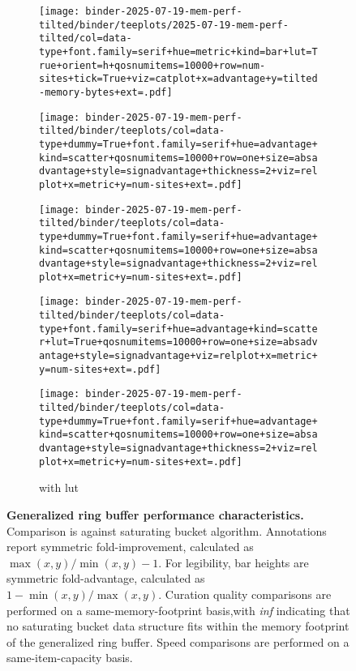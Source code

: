 \begin{figure*}
\begin{subfigure}{\textwidth}
\texttt{[image: binder-2025-07-19-mem-perf-tilted/binder/teeplots/2025-07-19-mem-perf-tilted/col=data-type+font.family=serif+hue=metric+kind=bar+lut=True+orient=h+qosnumitems=10000+row=num-sites+tick=True+viz=catplot+x=advantage+y=tilted-memory-bytes+ext=.pdf]}

\vspace{-1ex}

\texttt{[image: binder-2025-07-19-mem-perf-tilted/binder/teeplots/col=data-type+dummy=True+font.family=serif+hue=advantage+kind=scatter+qosnumitems=10000+row=one+size=absadvantage+style=signadvantage+thickness=2+viz=relplot+x=metric+y=num-sites+ext=.pdf]}

\vspace{-3ex}

\texttt{[image: binder-2025-07-19-mem-perf-tilted/binder/teeplots/col=data-type+dummy=True+font.family=serif+hue=advantage+kind=scatter+qosnumitems=10000+row=one+size=absadvantage+style=signadvantage+thickness=2+viz=relplot+x=metric+y=num-sites+ext=.pdf]}

\vspace{-1.2ex}

\texttt{[image: binder-2025-07-19-mem-perf-tilted/binder/teeplots/col=data-type+font.family=serif+hue=advantage+kind=scatter+lut=True+qosnumitems=10000+row=one+size=absadvantage+style=signadvantage+viz=relplot+x=metric+y=num-sites+ext=.pdf]}

\vspace{-2.8ex}

\texttt{[image: binder-2025-07-19-mem-perf-tilted/binder/teeplots/col=data-type+dummy=True+font.family=serif+hue=advantage+kind=scatter+qosnumitems=10000+row=one+size=absadvantage+style=signadvantage+thickness=2+viz=relplot+x=metric+y=num-sites+ext=.pdf]}

\vspace{-2ex}

\caption{with lut}
\label{fig:mem-perf-tilted:lut}
\end{subfigure}

\caption{
\textbf{Generalized ring buffer performance characteristics.}
\footnotesize
Comparison is against saturating bucket algorithm.
Annotations report symmetric fold-improvement, calculated as $\max(x, y) / \min(x, y) - 1$.
For legibility, bar heights are symmetric fold-advantage, calculated as $1 - \min(x, y) / \max(x, y)$.
Curation quality comparisons are performed on a same-memory-footprint basis,with \textit{inf} indicating that no saturating bucket data structure fits within the memory footprint of the generalized ring buffer.
Speed comparisons are performed on a same-item-capacity basis.
}
\label{fig:mem-perf-tilted}

\end{figure*}
